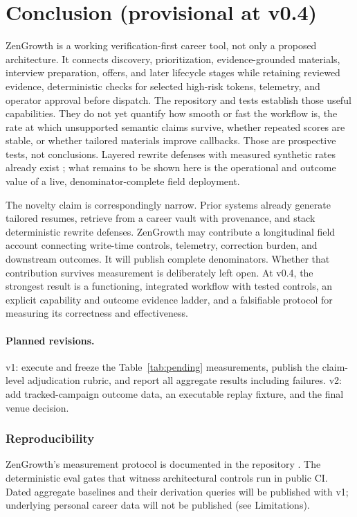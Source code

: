 \documentclass[11pt]{article}
\begin{document}
\section{Conclusion (provisional at v0.4)}

ZenGrowth is a working verification-first career tool, not only a proposed
architecture. It connects discovery, prioritization, evidence-grounded
materials, interview preparation, offers, and later lifecycle stages while
retaining reviewed evidence, deterministic checks for selected high-risk
tokens, telemetry, and operator approval before dispatch. The repository and
tests establish those useful capabilities. They do not yet quantify how smooth
or fast the workflow is, the rate at which unsupported semantic claims survive,
whether repeated scores are stable, or whether tailored materials improve
callbacks. Those are prospective tests, not conclusions. Layered rewrite
defenses with measured synthetic rates already exist
\citep{indukuri2026grounded}; what remains to be shown here is the operational
and outcome value of a live, denominator-complete field deployment.

The novelty claim is correspondingly narrow. Prior systems already generate
tailored resumes, retrieve from a career vault with provenance, and stack
deterministic rewrite defenses. ZenGrowth may contribute a longitudinal field
account connecting write-time controls, telemetry, correction burden, and
downstream outcomes. It will publish complete denominators. Whether that
contribution survives measurement is deliberately left open. At v0.4, the
strongest result is a functioning, integrated workflow with tested controls,
an explicit capability and outcome evidence ladder, and a falsifiable protocol
for measuring its correctness and effectiveness.

\paragraph{Planned revisions.} v1: execute and freeze the
Table~\ref{tab:pending} measurements, publish the claim-level adjudication
rubric, and report all aggregate results including failures. v2: add
tracked-campaign outcome data, an executable replay fixture, and the final
venue decision.

\subsubsection*{Reproducibility}
ZenGrowth's measurement protocol is documented in the repository
\citep{zengrowth2026protocol}. The deterministic eval gates that witness
architectural controls run in public CI. Dated aggregate baselines and their
derivation queries will be published with v1; underlying personal career data
will not be published (see Limitations).
\end{document}
